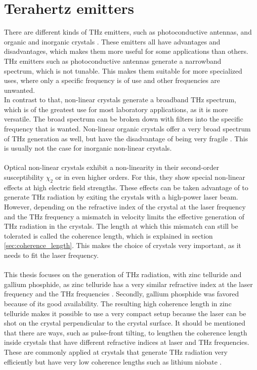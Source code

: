\section{Terahertz emitters}
\label{sec:emitters}
There are different kinds of $\si{\tera\hertz}$ emitters, such as photoconductive antennas, and organic and inorganic crystals \cite{Tutorial}.
These emitters all have advantages and disadvantages, which makes them more useful for some applications than others.
$\si{\tera\hertz}$ emitters such as photoconductive antennas generate a narrowband spectrum, which is not tunable.
This makes them suitable for more specialized uses, where only a specific frequency is of use and other frequencies are unwanted.
\\
In contrast to that, non-linear crystals generate a broadband $\si{\tera\hertz}$ spectrum, which is of the greatest use for most laboratory applications, as it is more versatile.
The broad spectrum can be broken down with filters into the specific frequency that is wanted.
Non-linear organic crystals offer a very broad spectrum of $\si{\tera\hertz}$ generation as well, but have the disadvantage of being very fragile \cite{organic_crystals}.
This is usually not the case for inorganic non-linear crystals.
\\\\
Optical non-linear crystals exhibit a non-linearity in their second-order susceptibility $\chi_2$ or in even higher orders.
For this, they show special non-linear effects at high electric field strengths.
These effects can be taken advantage of to generate $\si{\tera\hertz}$ radiation by exiting the crystals with a high-power laser beam.
\\
However, depending on the refractive index of the crystal at the laser frequency and the $\si{\tera\hertz}$ frequency a mismatch in velocity limits the effective generation of $\si{\tera\hertz}$ radiation in the crystals.
The length at which this mismatch can still be tolerated is called the coherence length, which is explained in section \ref{sec:coherence_length}.
This makes the choice of crystals very important, as it needs to fit the laser frequency.
\\\\
This thesis focuses on the generation of $\si{\tera\hertz}$ radiation, with zinc telluride and gallium phosphide, as zinc telluride has a very similar refractive index at the laser frequency and the $\si{\tera\hertz}$ frequencies \cite{coherence_legnth}.
Secondly, gallium phosphide was favored because of its good availability.
The resulting high coherence length in zinc telluride makes it possible to use a very compact setup because the laser can be shot on the crystal perpendicular to the crystal surface.
It should be mentioned that there are ways, such as pulse-front tilting, to lengthen the coherence length inside crystals that have different refractive indices at laser and $\si{\tera\hertz}$ frequencies.
These are commonly applied at crystals that generate $\si{\tera\hertz}$ radiation very efficiently but have very low coherence lengths such as lithium niobate \cite{pulsefront_tilting}.
